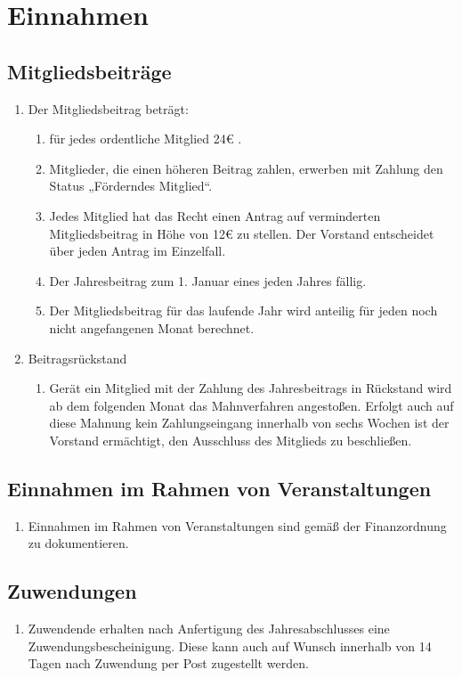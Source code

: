 \documentclass[12pt,a4paper,titlepage]{scrartcl}
\begin{document}
\section{Einnahmen}
\subsection{Mitgliedsbeiträge}
\begin{enumerate}
\item Der Mitgliedsbeitrag beträgt:
	\begin{enumerate}
	\item für jedes ordentliche Mitglied 24€ .
	\item Mitglieder, die einen höheren Beitrag zahlen, erwerben mit Zahlung den Status 
„Förderndes Mitglied“.
	\item Jedes Mitglied hat das Recht einen Antrag auf verminderten Mitgliedsbeitrag in 
Höhe von 12€ zu stellen. Der Vorstand entscheidet über jeden Antrag im 
Einzelfall. 
	\item Der Jahresbeitrag zum 1. Januar eines jeden Jahres fällig. 
	\item Der Mitgliedsbeitrag für das laufende Jahr wird anteilig für jeden noch nicht 
angefangenen Monat berechnet.   
	\end{enumerate}
\item Beitragsrückstand
	\begin{enumerate}
	\item Gerät ein Mitglied mit der Zahlung des Jahresbeitrags in Rückstand 
wird ab dem folgenden Monat das Mahnverfahren angestoßen. Erfolgt 
auch auf diese Mahnung kein Zahlungseingang innerhalb von sechs 
Wochen ist der Vorstand ermächtigt, den Ausschluss des Mitglieds zu 
beschließen.
	\end{enumerate}
\end{enumerate}
\subsection{Einnahmen im Rahmen von Veranstaltungen}
\begin{enumerate}
\item Einnahmen im Rahmen von Veranstaltungen sind gemäß der Finanzordnung zu 
dokumentieren. 	
\end{enumerate}

\subsection{Zuwendungen}
\begin{enumerate}
\item Zuwendende erhalten nach Anfertigung des Jahresabschlusses eine 
Zuwendungsbescheinigung. Diese kann auch auf Wunsch innerhalb von 14 Tagen nach 
Zuwendung per Post zugestellt werden.  
\end{enumerate}
\end{document}
